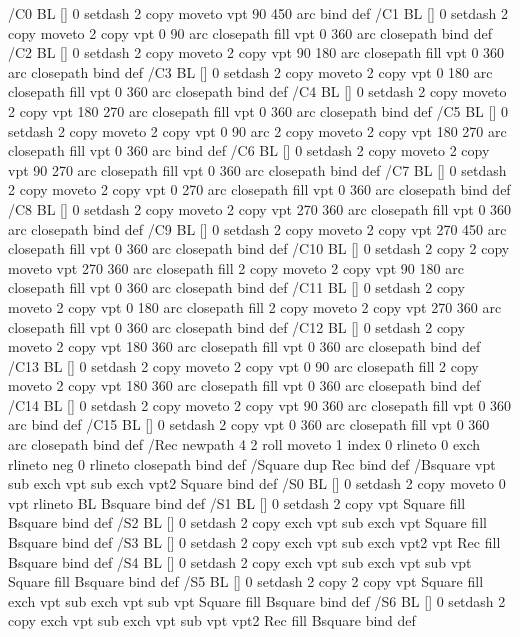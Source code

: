 /C0 {BL [] 0 setdash 2 copy moveto vpt 90 450 arc} bind def
/C1 {BL [] 0 setdash 2 copy moveto
	2 copy vpt 0 90 arc closepath fill
	vpt 0 360 arc closepath} bind def
/C2 {BL [] 0 setdash 2 copy moveto
	2 copy vpt 90 180 arc closepath fill
	vpt 0 360 arc closepath} bind def
/C3 {BL [] 0 setdash 2 copy moveto
	2 copy vpt 0 180 arc closepath fill
	vpt 0 360 arc closepath} bind def
/C4 {BL [] 0 setdash 2 copy moveto
	2 copy vpt 180 270 arc closepath fill
	vpt 0 360 arc closepath} bind def
/C5 {BL [] 0 setdash 2 copy moveto
	2 copy vpt 0 90 arc
	2 copy moveto
	2 copy vpt 180 270 arc closepath fill
	vpt 0 360 arc} bind def
/C6 {BL [] 0 setdash 2 copy moveto
	2 copy vpt 90 270 arc closepath fill
	vpt 0 360 arc closepath} bind def
/C7 {BL [] 0 setdash 2 copy moveto
	2 copy vpt 0 270 arc closepath fill
	vpt 0 360 arc closepath} bind def
/C8 {BL [] 0 setdash 2 copy moveto
	2 copy vpt 270 360 arc closepath fill
	vpt 0 360 arc closepath} bind def
/C9 {BL [] 0 setdash 2 copy moveto
	2 copy vpt 270 450 arc closepath fill
	vpt 0 360 arc closepath} bind def
/C10 {BL [] 0 setdash 2 copy 2 copy moveto vpt 270 360 arc closepath fill
	2 copy moveto
	2 copy vpt 90 180 arc closepath fill
	vpt 0 360 arc closepath} bind def
/C11 {BL [] 0 setdash 2 copy moveto
	2 copy vpt 0 180 arc closepath fill
	2 copy moveto
	2 copy vpt 270 360 arc closepath fill
	vpt 0 360 arc closepath} bind def
/C12 {BL [] 0 setdash 2 copy moveto
	2 copy vpt 180 360 arc closepath fill
	vpt 0 360 arc closepath} bind def
/C13 {BL [] 0 setdash 2 copy moveto
	2 copy vpt 0 90 arc closepath fill
	2 copy moveto
	2 copy vpt 180 360 arc closepath fill
	vpt 0 360 arc closepath} bind def
/C14 {BL [] 0 setdash 2 copy moveto
	2 copy vpt 90 360 arc closepath fill
	vpt 0 360 arc} bind def
/C15 {BL [] 0 setdash 2 copy vpt 0 360 arc closepath fill
	vpt 0 360 arc closepath} bind def
/Rec {newpath 4 2 roll moveto 1 index 0 rlineto 0 exch rlineto
	neg 0 rlineto closepath} bind def
/Square {dup Rec} bind def
/Bsquare {vpt sub exch vpt sub exch vpt2 Square} bind def
/S0 {BL [] 0 setdash 2 copy moveto 0 vpt rlineto BL Bsquare} bind def
/S1 {BL [] 0 setdash 2 copy vpt Square fill Bsquare} bind def
/S2 {BL [] 0 setdash 2 copy exch vpt sub exch vpt Square fill Bsquare} bind def
/S3 {BL [] 0 setdash 2 copy exch vpt sub exch vpt2 vpt Rec fill Bsquare} bind def
/S4 {BL [] 0 setdash 2 copy exch vpt sub exch vpt sub vpt Square fill Bsquare} bind def
/S5 {BL [] 0 setdash 2 copy 2 copy vpt Square fill
	exch vpt sub exch vpt sub vpt Square fill Bsquare} bind def
/S6 {BL [] 0 setdash 2 copy exch vpt sub exch vpt sub vpt vpt2 Rec fill Bsquare} bind def
